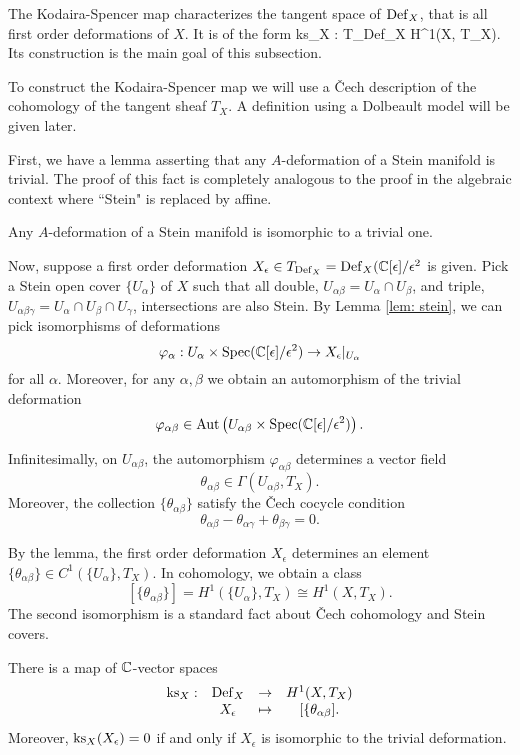 \documentclass[11pt]{amsart}
\def\Spec{{\rm Spec}}
\def\Def{{\rm Def}}
\begin{document}
\def\ks{{\rm ks}}

The Kodaira-Spencer map characterizes the tangent space of $\Def_X$, that is all first order deformations of $X$. 
It is of the form
\beqn\label{ks1}
\ks_X : T_{\Def_X} \to H^1(X, T_X). 
\eeqn
Its construction is the main goal of this subsection.  

To construct the Kodaira-Spencer map we will use a \v{C}ech description of the cohomology of the tangent sheaf $T_X$. 
A definition using a Dolbeault model will be given later. 

First, we have a lemma asserting that any $A$-deformation of a Stein manifold is trivial. 
The proof of this fact is completely analogous to the proof in the algebraic context where ``Stein" is replaced by affine.

\begin{lem}\label{lem: stein}
Any $A$-deformation of a Stein manifold is isomorphic to a trivial one. 
\end{lem}

Now, suppose a first order deformation $X_\epsilon \in T_{\Def_X} = \Def_X(\CC[\epsilon]/\epsilon^2$ is given. 
Pick a Stein open cover $\{U_\alpha\}$ of $X$ such that all double, $U_{\alpha\beta} = U_{\alpha} \cap U_\beta$, and triple, $U_{\alpha\beta\gamma} = U_\alpha \cap U_\beta \cap U_\gamma$, intersections are also Stein. 
By Lemma \ref{lem: stein}, we can pick isomorphisms of deformations
\[
\varphi_\alpha : U_\alpha \times \Spec(\CC[\epsilon]/\epsilon^2) \to X_\epsilon |_{U_\alpha} 
\]
for all $\alpha$. 
Moreover, for any $\alpha,\beta$ we obtain an automorphism of the trivial deformation
\[
\varphi_{\alpha\beta} \in {\rm Aut} \left(U_{\alpha\beta} \times \Spec(\CC[\epsilon]/\epsilon^2) \right) .
\]

\begin{lem}
Infinitesimally, on $U_{\alpha \beta}$, the automorphism $\varphi_{\alpha \beta}$ determines a vector field
\[
\theta_{\alpha \beta} \in \Gamma(U_{\alpha\beta}, T_X) .
\]
Moreover, the collection $\{\theta_{\alpha \beta}\}$ satisfy the \v{C}ech cocycle condition 
\[
\theta_{\alpha \beta} - \theta_{\alpha \gamma} + \theta_{\beta \gamma} = 0 .
\]
\end{lem}

By the lemma, the first order deformation $X_\epsilon$ determines an element $\{\theta_{\alpha \beta}\} \in C^1(\{U_{\alpha}\}, T_X)$. 
In cohomology, we obtain a class
\[
[ \{\theta_{\alpha \beta}\} ] = H^1(\{U_{\alpha}\}, T_X) \cong H^1(X, T_X) .
\]
The second isomorphism is a standard fact about \v{C}ech cohomology and Stein covers. 

\begin{thm}
There is a map of $\mathbb C$-vector spaces 
\[
\begin{array}{cccc}
\ks_X : & \Def_X & \to & H^1(X, T_X) \\
 & X_{\epsilon} & \mapsto & [\{\theta_{\alpha \beta}] .
 \end{array}
 \]
Moreover, $\ks_X(X_{\epsilon}) = 0$ if and only if $X_\epsilon$ is isomorphic to the trivial deformation.
\end{thm}
\end{document}
